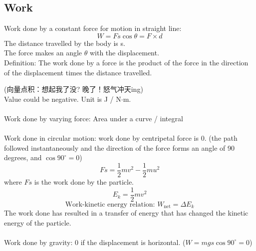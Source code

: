 \subsection{Work}
Work done by a constant force for motion in straight line:
\[W=Fs\cos\theta=F\times d\]
The distance travelled by the body is s. \\The force makes an angle $\theta$ with the displacement. \\Definition: The work done by a force is the product of the force in the direction of the displacement times the distance travelled.
\begin{center}
\end{center}
(向量点积：想起我了没? 晚了！怒气冲天ing)\\
Value could be negative. Unit is J / N$\cdot$m.\\\\
Work done by varying force: Area under a curve / integral\\\\
Work done in circular motion: work done by centripetal force is 0. (the path followed instantaneously and the direction of the force forms an angle of 90 degrees, and $\cos 90^\circ=0$)
\[Fs=\dfrac{1}{2}mv^2-\dfrac{1}{2}mu^2\]
where $Fs$ is the work done by the particle.
\[E_k=\dfrac{1}{2}mv^2\]
\[\text{Work-kinetic energy relation: }W_\text{net}=\Delta E_k\]
The work done has resulted in a transfer of energy that has changed the kinetic energy of the particle.\\\\
Work done by gravity: 0 if the displacement is horizontal. ($W=mgs\cos 90^\circ=0$)\\
